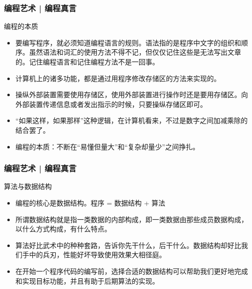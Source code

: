 \begin{frame}
  \frametitle{编程艺术 | 编程真言}
  \begin{block}{编程的本质}
    \begin{itemize}
      \item 要编写程序，就必须知道编程语言的规则。语法指的是程序中文字的组织和顺序。虽然语法和词汇的使用方法不得不记，但仅仅记住这些是无法写出文章的。记住编程语言和记住\alert{编程方法}不是一回事。
      \item 计算机上的诸多功能，都是通过\alert{用程序修改存储区}的方法来实现的。
      \item 操纵外部装置需要使用存储区，使用外部装置进行操作时还是要用存储区。向外部装置传递信息或者发出指示的时候，只要操纵存储区即可。
      \item “如果这样，如果那样”这种逻辑，在计算机看来，不过是数字之间加减乘除的结合罢了。
      \item 编程的本质：不断在“易懂但量大”和“复杂却量少”之间挣扎。
    \end{itemize}
  \end{block}
\end{frame}

\begin{frame}
  \frametitle{编程艺术 | 编程真言}
  \begin{block}{算法与数据结构}
    \begin{itemize}
      \item 编程的核心是数据结构。\alert{程序 = 数据结构 + 算法}
      \item 所谓数据结构就是指一类数据的内部构成，即一类数据由那些成员数据构成，以什么方式构成，有什么特点。
      \item 算法好比武术中的种种套路，告诉你先干什么，后干什么。数据结构却好比我们手中的兵刃，性能好坏导致使用效果大相径庭。
      \item 在开始一个程序代码的编写前，选择合适的数据结构可以帮助我们更好地完成和实现目标功能，并且有助于后期算法的实现。
    \end{itemize}
  \end{block}
\end{frame}

